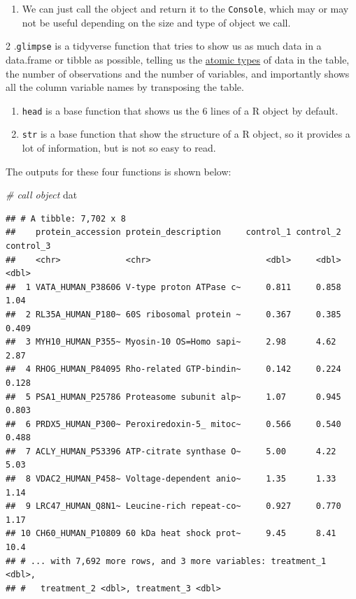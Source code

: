\documentclass[12pt,]{book}
\newenvironment{Shaded}{\begin{snugshade}}{\end{snugshade}}
\newcommand{\CommentTok}[1]{\textcolor[rgb]{0.56,0.35,0.01}{\textit{#1}}}
\newcommand{\NormalTok}[1]{#1}
\providecommand{\tightlist}{%
  \setlength{\itemsep}{0pt}\setlength{\parskip}{0pt}}
\theoremstyle{definition}
\theoremstyle{definition}
\theoremstyle{definition}
\theoremstyle{remark}
\begin{document}
\begin{enumerate}
\def\labelenumi{\arabic{enumi}.}
\tightlist
\item
  We can just call the object and return it to the \texttt{Console},
  which may or may not be useful depending on the size and type of
  object we call.
\end{enumerate}

2 .\texttt{glimpse} is a tidyverse function that tries to show us as
much data in a data.frame or tibble as possible, telling us the
\protect\hyperlink{atomics}{atomic types} of data in the table, the
number of observations and the number of variables, and importantly
shows all the column variable names by transposing the table.

\begin{enumerate}
\def\labelenumi{\arabic{enumi}.}
\setcounter{enumi}{2}
\item
  \texttt{head} is a base function that shows us the 6 lines of a R
  object by default.
\item
  \texttt{str} is a base function that show the structure of a R object,
  so it provides a lot of information, but is not so easy to read.
\end{enumerate}

The outputs for these four functions is shown below:

\begin{Shaded}
\begin{Highlighting}[]
\CommentTok{# call object}
\NormalTok{dat}
\end{Highlighting}
\end{Shaded}

\begin{verbatim}
## # A tibble: 7,702 x 8
##    protein_accession protein_description     control_1 control_2 control_3
##    <chr>             <chr>                       <dbl>     <dbl>     <dbl>
##  1 VATA_HUMAN_P38606 V-type proton ATPase c~     0.811     0.858     1.04 
##  2 RL35A_HUMAN_P180~ 60S ribosomal protein ~     0.367     0.385     0.409
##  3 MYH10_HUMAN_P355~ Myosin-10 OS=Homo sapi~     2.98      4.62      2.87 
##  4 RHOG_HUMAN_P84095 Rho-related GTP-bindin~     0.142     0.224     0.128
##  5 PSA1_HUMAN_P25786 Proteasome subunit alp~     1.07      0.945     0.803
##  6 PRDX5_HUMAN_P300~ Peroxiredoxin-5_ mitoc~     0.566     0.540     0.488
##  7 ACLY_HUMAN_P53396 ATP-citrate synthase O~     5.00      4.22      5.03 
##  8 VDAC2_HUMAN_P458~ Voltage-dependent anio~     1.35      1.33      1.14 
##  9 LRC47_HUMAN_Q8N1~ Leucine-rich repeat-co~     0.927     0.770     1.17 
## 10 CH60_HUMAN_P10809 60 kDa heat shock prot~     9.45      8.41     10.4  
## # ... with 7,692 more rows, and 3 more variables: treatment_1 <dbl>,
## #   treatment_2 <dbl>, treatment_3 <dbl>
\end{verbatim}
\end{document}
